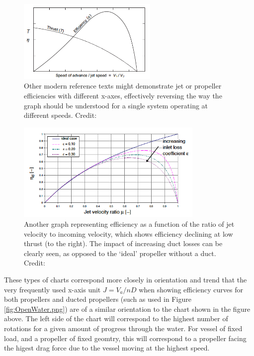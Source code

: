 \documentclass{article}\usepackage[]{graphicx}\usepackage[]{color}
\begin{document}
\begin{figure}[h]
\captionsetup{width=0.6\textwidth}
\includegraphics[width=0.6\textwidth, center]{EfficiencyMollard.png}
\caption{Other modern reference texts might demonstrate jet or propeller efficiencies with different x-axes, effectively reversing the way the graph should be understood for a single system operating at different speeds. Credit:  \cite{mollard2011}}
\label{fig:EfficiencyMollard.png}
\end{figure}

\begin{figure}[h] \captionsetup{width=0.6\textwidth}
\includegraphics[width=0.8\textwidth, center]{EfficiencyBulten.png}
\caption{Another graph representing efficiency as a function of the ratio of jet velocity to incoming velocity, which shows efficiency declining at low thrust (to the right).  The impact of increasing duct losses can be clearly seen, as opposed to the `ideal' propeller without a duct. Credit: \cite{bulten2006numerical}}
\label{fig:EfficiencyBulten.png}
\end{figure}

These types of charts correspond more closely in orientation and trend that the very frequently used x-axis unit $J = V_a/nD$ when showing efficiency curves for both propellers and ducted propellers (such as used in Figure \ref{fig:OpenWater.png}) are of a similar orientation to the chart shown in the figure above.  The left side of the chart will correspond to the highest number of rotations for a given amount of progress through the water.  For vessel of fixed load, and a propeller of fixed geomtry, this will correspond to a propeller facing the higest drag force due to the vessel moving at the highest speed.
\end{document}
